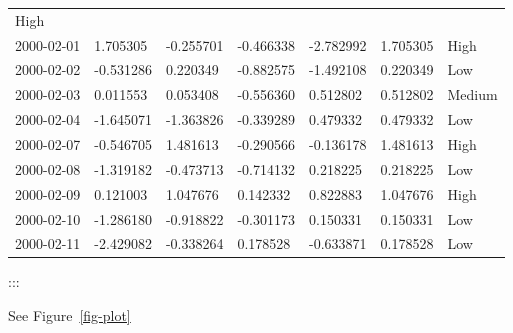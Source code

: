 \documentclass[
  letterpaper,
  DIV=11,
  numbers=noendperiod]{scrartcl}
\begin{document}
\begin{longtable}[]{@{}lllllll@{}}
High \\
2000-02-01 & 1.705305 & -0.255701 & -0.466338 & -2.782992 & 1.705305 &
High \\
2000-02-02 & -0.531286 & 0.220349 & -0.882575 & -1.492108 & 0.220349 &
Low \\
2000-02-03 & 0.011553 & 0.053408 & -0.556360 & 0.512802 & 0.512802 &
Medium \\
2000-02-04 & -1.645071 & -1.363826 & -0.339289 & 0.479332 & 0.479332 &
Low \\
2000-02-07 & -0.546705 & 1.481613 & -0.290566 & -0.136178 & 1.481613 &
High \\
2000-02-08 & -1.319182 & -0.473713 & -0.714132 & 0.218225 & 0.218225 &
Low \\
2000-02-09 & 0.121003 & 1.047676 & 0.142332 & 0.822883 & 1.047676 &
High \\
2000-02-10 & -1.286180 & -0.918822 & -0.301173 & 0.150331 & 0.150331 &
Low \\
2000-02-11 & -2.429082 & -0.338264 & 0.178528 & -0.633871 & 0.178528 &
Low \\
\bottomrule()
\end{longtable}

:::

See Figure~\ref{fig-plot}
\end{document}
